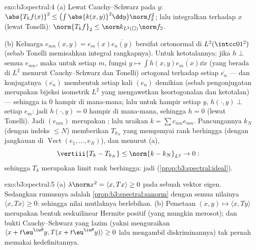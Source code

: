 \begin{solution}{exo:b3:spectral:4}
(a) Lewat Cauchy--Schwarz pada $y$: $\abs{T_kf(x)}^2 \leq
\bigl(\int\abs{k(x,y)}^2\dd y\bigr)\norm f_2^2$; lalu integralkan terhadap
$x$ (lewat Tonelli): $\norm{T_kf}_2 \leq \norm k_{L^2(\square)}
\norm f_2$.

(b) Keluarga $e_{mn}(x,y) = e_m(x)\overline{e_n(y)}$ bersifat
ortonormal di $L^2(\intcc01^2)$ (sebab Tonelli memisahkan integral
rangkapnya). Untuk ketotalannya: jika $h \perp$ semua $e_{mn}$, maka untuk setiap
$m$, fungsi $y \mapsto \int h(x,y)\overline{e_m(x)}\dd
x$ (yang berada di $L^2$ menurut Cauchy--Schwarz dan Tonelli) ortogonal terhadap
setiap $\overline{e_n}$ --- dan konjugatnya
$(\overline{e_n})$ membentuk  setiap kali $(e_n)$ demikian
(sebab pengonjugatan merupakan bijeksi isometrik $L^2$ yang mengawetkan
keortogonalan dan ketotalan) --- sehingga ia $0$ hampir di mana-mana; lalu untuk hampir setiap $y$, $h(\cdot, y) \perp$ setiap
$e_m$: jadi $h(\cdot, y) = 0$ hampir di mana-mana, sehingga $h = 0$ (lewat Tonelli). Jadi
$(e_{mn})$ merupakan ; lalu uraikan $k = \sum c_{mn}e_{mn}$.
Pancungannya $k_N$ (dengan indeks $\leq N$) memberikan $T_{k_N}$ yang
mempunyai rank berhingga (dengan jangkauan di $\operatorname{Vect}(e_1, \dots,
e_N)$), dan menurut (a),
\[
\vertiii{T_k - T_{k_N}} \leq \norm{k - k_N}_{L^2} \to 0 :
\]
sehingga $T_k$ merupakan limit  rank berhingga: jadi 
(\cref{prop:b3:spectral:ideal}).
\end{solution}

\begin{solution}{exo:b3:spectral:5}
(a) $\lambda\norm x^2 = \langle x, Tx\rangle \geq 0$ pada sebuah
vektor eigen. Sedangkan rumusnya adalah
\cref{prop:b3:spectral:sanorm} dengan semua nilainya $\langle x,
Tx\rangle \geq 0$: sehingga nilai mutlaknya berlebihan.
(b) Pemetaan $(x, y) \mapsto \langle x, Ty\rangle$ merupakan bentuk
seskuilinear Hermite positif (yang mungkin merosot); dan bukti
Cauchy--Schwarz yang lazim (yakni menguraikan $\langle x + t\eu^{\iu\theta}y,
T(x + t\eu^{\iu\theta}y)\rangle \geq 0$ lalu mengambil
diskriminannya) tak pernah memakai kedefinitannya.
\end{solution}

